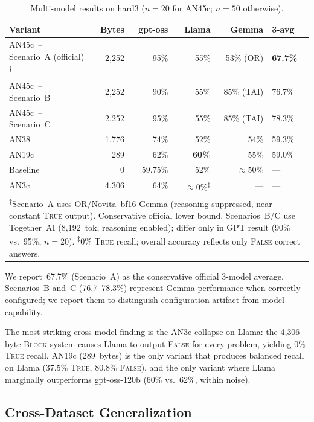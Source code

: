 \documentclass[11pt]{article}
\begin{document}
\begin{table}[h]
\centering
\caption{Multi-model results on hard3 ($n=20$ for AN45c; $n=50$ otherwise).}
\label{tab:multimodel}
\small
\begin{tabular}{lrrrrl}
\toprule
Variant & Bytes & gpt-oss & Llama & Gemma & 3-avg \\
\midrule
AN45c~-- Scenario~A (official)\textsuperscript{$\dagger$}
    & 2{,}252 & 95\% & 55\% & 53\% (OR) & \textbf{67.7\%} \\
AN45c~-- Scenario~B
    & 2{,}252 & 90\% & 55\% & 85\% (TAI) & 76.7\% \\
AN45c~-- Scenario~C
    & 2{,}252 & 95\% & 55\% & 85\% (TAI) & 78.3\% \\
AN38    & 1{,}776 & 74\% & 52\% & 54\% & 59.3\% \\
AN19c   & 289   & 62\% & \textbf{60\%} & 55\% & 59.0\% \\
Baseline & 0    & 59.75\% & 52\% & $\approx$50\% & --- \\
AN3c    & 4{,}306 & 64\% & $\approx$0\%\textsuperscript{$\ddagger$} & --- & --- \\
\bottomrule
\multicolumn{6}{p{0.92\textwidth}}{%
\textsuperscript{$\dagger$}Scenario~A uses OR/Novita~bf16 Gemma (reasoning suppressed,
near-constant \textsc{True} output). Conservative official lower bound.
Scenarios~B/C use Together~AI (8{,}192~tok, reasoning enabled); differ
only in GPT result (90\% vs.\ 95\%, $n=20$).
\textsuperscript{$\ddagger$}0\% \textsc{True} recall; overall accuracy reflects only \textsc{False} correct answers.}
\end{tabular}
\end{table}

We report~67.7\% (Scenario~A) as the conservative official 3-model
average. Scenarios~B and~C (76.7--78.3\%) represent Gemma performance
when correctly configured; we report them to distinguish configuration
artifact from model capability.

The most striking cross-model finding is the AN3c collapse on Llama:
the 4{,}306-byte \textsc{Block} system causes Llama to output
\textsc{False} for every problem, yielding 0\% \textsc{True} recall.
AN19c (289~bytes) is the only variant that produces balanced recall on
Llama (37.5\% \textsc{True}, 80.8\% \textsc{False}), and the only
variant where Llama marginally outperforms gpt-oss-120b (60\%
vs.~62\%, within noise).

\subsection{Cross-Dataset Generalization}
\label{subsec:dataset}
\end{document}
